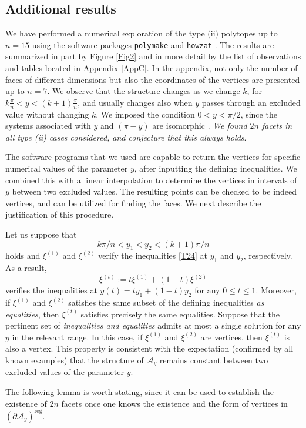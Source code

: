 \documentclass[a4paper,11pt,reqno]{amsart}
\theoremstyle{definition}
\numberwithin{equation}{section}
\newcommand{\be}{\begin{equation}}
\newcommand{\ee}{\end{equation}}
\def\cA{{\mathcal A}}                       %
\def\reg{\mathrm{reg}}                      %
\def\reg{\mathrm{reg}}                      %
\begin{document}
\subsection{Additional results}\label{Sec52}

We have performed a numerical exploration  of the type (ii) polytopes up to $n=15$
using the   software packages  {\tt polymake} \cite{poly} and {\tt howzat} \cite{howzat}.  The results are summarized
in part by Figure \ref{Fig2} and in more detail by the list of observations and tables located in Appendix \ref{AppC}.
In the appendix,  not only the number of faces of different dimensions but also the coordinates of the vertices
are presented up to $n=7$.
We observe that the structure changes as we change $k$,  for $k \frac{\pi}{n} < y < (k+1)\frac{\pi}{n}$,
and usually changes also when $y$ passes through an excluded value without changing $k$.
We imposed the condition $0<y<\pi/2$, since the systems associated with $y$ and $(\pi-y)$  are isomorphic \cite{FK}.
\emph{We found $2n$ facets in all type (ii) cases considered, and conjecture that this always holds}.

The software programs that we used are  capable to  return  the vertices for specific numerical values of the
parameter $y$, after inputting the defining inequalities.
We combined this with a linear interpolation to determine the vertices in intervals of $y$ between two excluded values.
The resulting points can be checked to be indeed vertices, and can be utilized for finding the faces.
We next describe the justification of this procedure.

Let us suppose that
\be
 k \pi/n < y_1 < y_2 < (k+1)\pi/n
 \ee
  holds and $\xi^{(1)}$ and $\xi^{(2)}$ verify the inequalities \eqref{T24} at $y_1$ and $y_2$, respectively.
As a result,
\be
\xi^{(t)}:= t \xi^{(1)} + (1-t) \xi^{(2)}
\ee
verifies the inequalities at $y(t) = t y_1 + (1-t) y_2$ for any $0\leq t \leq 1$.
Moreover, if $\xi^{(1)}$ and $\xi^{(2)}$ satisfies the same subset of the defining inequalities \emph{as equalities},
then $\xi^{(t)}$ satisfies precisely the same equalities.
Suppose that the pertinent set of \emph{inequalities and equalities} admits at most a single solution for any $y$ in the relevant range.
In this case, if $\xi^{(1)}$ and $\xi^{(2)}$ are vertices, then $\xi^{(t)}$ is also a vertex.
This property is consistent with the  expectation (confirmed by all known examples) that the structure of $\cA_y$ remains constant
between two excluded values of the parameter $y$.


The following lemma is worth stating, since it can be used to establish the existence of $2n$ facets once one knows the existence and the
form of vertices in $(\partial \cA_y)^\reg$.
\end{document}

